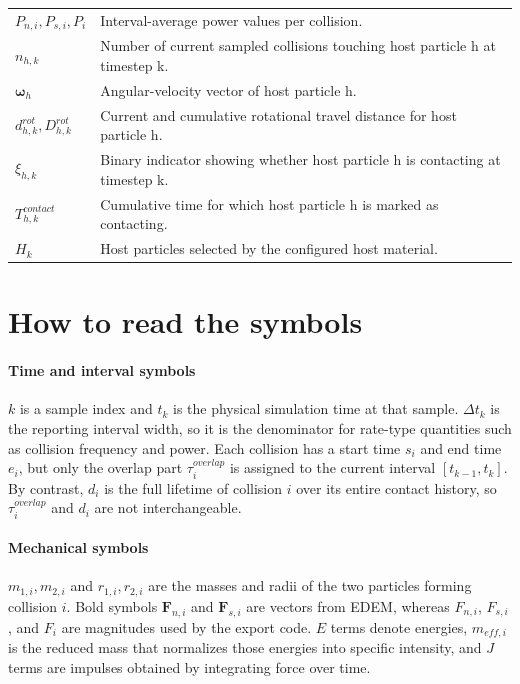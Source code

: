 \documentclass[11pt,a4paper]{article}
\begin{document}
\begin{longtable}{@{}L{0.22\textwidth}L{0.70\textwidth}@{}}
$P_{n,i}, P_{s,i}, P_i$ & Interval-average power values per collision.\\
$n_{h,k}$ & Number of current sampled collisions touching host particle h at timestep k.\\
$\boldsymbol{\omega}_h$ & Angular-velocity vector of host particle h.\\
$d_{h,k}^{rot}, D_{h,k}^{rot}$ & Current and cumulative rotational travel distance for host particle h.\\
$\xi_{h,k}$ & Binary indicator showing whether host particle h is contacting at timestep k.\\
$T_{h,k}^{contact}$ & Cumulative time for which host particle h is marked as contacting.\\
$H_k$ & Host particles selected by the configured host material.\\
\bottomrule
\end{longtable}

\section*{How to read the symbols}
\paragraph{Time and interval symbols}
$k$ is a sample index and $t_k$ is the physical simulation time at that sample.
$\Delta t_k$ is the reporting interval width, so it is the denominator for rate-type quantities such as collision frequency and power.
Each collision has a start time $s_i$ and end time $e_i$, but only the overlap part $\tau_i^{overlap}$ is assigned to the current interval $[t_{k-1}, t_k]$.
By contrast, $d_i$ is the full lifetime of collision $i$ over its entire contact history, so $\tau_i^{overlap}$ and $d_i$ are not interchangeable.

\paragraph{Mechanical symbols}
$m_{1,i}, m_{2,i}$ and $r_{1,i}, r_{2,i}$ are the masses and radii of the two particles forming collision $i$.
Bold symbols $\mathbf{F}_{n,i}$ and $\mathbf{F}_{s,i}$ are vectors from EDEM, whereas $F_{n,i}$, $F_{s,i}$, and $F_i$ are magnitudes used by the export code.
$E$ terms denote energies, $m_{eff,i}$ is the reduced mass that normalizes those energies into specific intensity, and $J$ terms are impulses obtained by integrating force over time.
\end{document}
